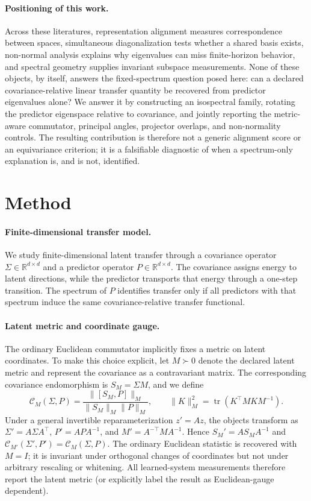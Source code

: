 \documentclass{article}
\DeclareMathOperator{\tr}{tr}
\newcommand{\R}{\mathbb{R}}
\begin{document}
\paragraph{Positioning of this work.}
Across these literatures, representation alignment measures correspondence between spaces, simultaneous diagonalization tests whether a shared basis exists, non-normal analysis explains why eigenvalues can miss finite-horizon behavior, and spectral geometry supplies invariant subspace measurements. None of these objects, by itself, answers the fixed-spectrum question posed here: can a declared covariance-relative linear transfer quantity be recovered from predictor eigenvalues alone? We answer it by constructing an isospectral family, rotating the predictor eigenspace relative to covariance, and jointly reporting the metric-aware commutator, principal angles, projector overlaps, and non-normality controls. The resulting contribution is therefore not a generic alignment score or an equivariance criterion; it is a falsifiable diagnostic of when a spectrum-only explanation is, and is not, identified.

\section{Method}

\paragraph{Finite-dimensional transfer model.}
We study finite-dimensional latent transfer through a covariance operator $\Sigma\in\R^{d\times d}$ and a predictor operator $P\in\R^{d\times d}$. The covariance assigns energy to latent directions, while the predictor transports that energy through a one-step transition. The spectrum of $P$ identifies transfer only if all predictors with that spectrum induce the same covariance-relative transfer functional.

\paragraph{Latent metric and coordinate gauge.}
The ordinary Euclidean commutator implicitly fixes a metric on latent
coordinates. To make this choice explicit, let $M\succ0$ denote the declared
latent metric and represent the covariance as a contravariant matrix. The
corresponding covariance endomorphism is $S_M=\Sigma M$, and we define
\begin{equation}
\label{eq:metric-aware-commutator}
\mathcal{C}_M(\Sigma,P)=
\frac{\|[S_M,P]\|_M}{\|S_M\|_M\|P\|_M},\qquad
\|K\|_M^2=\tr(K^\top M K M^{-1}).
\end{equation}
Under a general invertible reparameterization $z'=Az$, the objects transform
as $\Sigma'=A\Sigma A^\top$, $P'=APA^{-1}$, and
$M'=A^{-\top}MA^{-1}$. Hence $S_M'=AS_MA^{-1}$ and
$\mathcal{C}_{M'}(\Sigma',P')=\mathcal{C}_M(\Sigma,P)$. The ordinary
Euclidean statistic is recovered with $M=I$; it is invariant under orthogonal
changes of coordinates but not under arbitrary rescaling or whitening. All
learned-system measurements therefore report the latent metric (or explicitly
label the result as Euclidean-gauge dependent).
\end{document}
